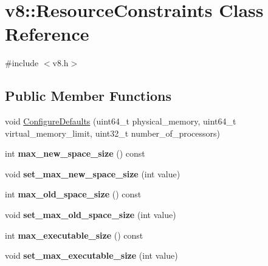 \hypertarget{classv8_1_1ResourceConstraints}{\section{v8\-:\-:Resource\-Constraints Class Reference}
\label{classv8_1_1ResourceConstraints}
}


{\ttfamily \#include $<$v8.\-h$>$}

\subsection*{Public Member Functions}
\begin{DoxyCompactItemize}
\item 
void \hyperlink{classv8_1_1ResourceConstraints_a6e5d38fd99d89d4fc10e325507d08d52}{Configure\-Defaults} (uint64\-\_\-t physical\-\_\-memory, uint64\-\_\-t virtual\-\_\-memory\-\_\-limit, uint32\-\_\-t number\-\_\-of\-\_\-processors)
\item 
\hypertarget{classv8_1_1ResourceConstraints_a5c8f7c1c07216d5bf374bfaacad25b6c}{int {\bfseries max\-\_\-new\-\_\-space\-\_\-size} () const }\label{classv8_1_1ResourceConstraints_a5c8f7c1c07216d5bf374bfaacad25b6c}

\item 
\hypertarget{classv8_1_1ResourceConstraints_af4d372fa73974d8cb5f9ee60de3ef549}{void {\bfseries set\-\_\-max\-\_\-new\-\_\-space\-\_\-size} (int value)}\label{classv8_1_1ResourceConstraints_af4d372fa73974d8cb5f9ee60de3ef549}

\item 
\hypertarget{classv8_1_1ResourceConstraints_a72840efdbcfc7bb287c6aea38d0b07b9}{int {\bfseries max\-\_\-old\-\_\-space\-\_\-size} () const }\label{classv8_1_1ResourceConstraints_a72840efdbcfc7bb287c6aea38d0b07b9}

\item 
\hypertarget{classv8_1_1ResourceConstraints_aa764be7c76b4baa3fce7a54c3777b5e9}{void {\bfseries set\-\_\-max\-\_\-old\-\_\-space\-\_\-size} (int value)}\label{classv8_1_1ResourceConstraints_aa764be7c76b4baa3fce7a54c3777b5e9}

\item 
\hypertarget{classv8_1_1ResourceConstraints_a037777e608ed1c22fe294ecef5722036}{int {\bfseries max\-\_\-executable\-\_\-size} () const }\label{classv8_1_1ResourceConstraints_a037777e608ed1c22fe294ecef5722036}

\item 
\hypertarget{classv8_1_1ResourceConstraints_a37d1b38672e9844c567823a119dcd557}{void {\bfseries set\-\_\-max\-\_\-executable\-\_\-size} (int value)}\label{classv8_1_1ResourceConstraints_a37d1b38672e9844c567823a119dcd557}


\end{DoxyCompactItemize}
